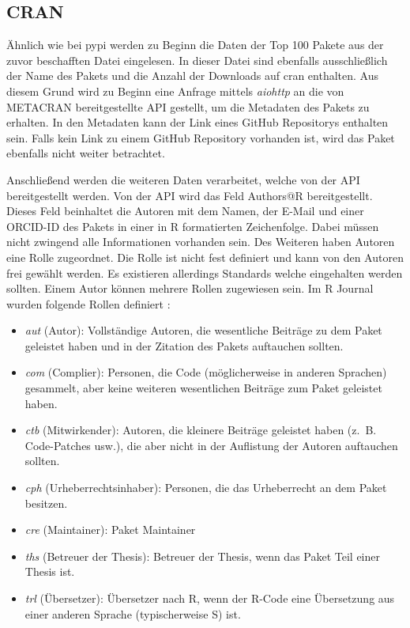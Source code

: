 \subsection{CRAN}
\label{subsec:datenbeschaffung_cran}
Ähnlich wie bei \gls{pypi} werden zu Beginn die Daten der Top 100 Pakete aus der zuvor beschafften Datei eingelesen.
In dieser Datei sind ebenfalls ausschließlich der Name des Pakets und die Anzahl der Downloads auf \gls{cran} enthalten.
Aus diesem Grund wird zu Beginn eine Anfrage mittels \emph{aiohttp} an die von METACRAN bereitgestellte API gestellt, um die Metadaten des Pakets zu erhalten.
In den Metadaten kann der Link eines GitHub Repositorys enthalten sein.
Falls kein Link zu einem GitHub Repository vorhanden ist, wird das Paket ebenfalls nicht weiter betrachtet.

Anschließend werden die weiteren Daten verarbeitet, welche von der API bereitgestellt werden.
Von der API wird das Feld \glqq Authors@R\grqq{} bereitgestellt.
Dieses Feld beinhaltet die Autoren mit dem Namen, der E-Mail und einer ORCID-ID des Pakets in einer in R formatierten Zeichenfolge.
Dabei müssen nicht zwingend alle Informationen vorhanden sein.
Des Weiteren haben Autoren eine Rolle zugeordnet.
Die Rolle ist nicht fest definiert und kann von den Autoren frei gewählt werden.
Es existieren allerdings Standards welche eingehalten werden sollten.
Einem Autor können mehrere Rollen zugewiesen sein.
Im R Journal wurden folgende Rollen definiert \autocite{hornik_who_2011}:

\begin{itemize}
    \item \glqq \emph{aut}\grqq{} (Autor): Vollständige Autoren, die wesentliche Beiträge zu dem Paket geleistet haben und in der Zitation des Pakets auftauchen sollten.
    \item \glqq \emph{com}\grqq{} (Complier): Personen, die Code (möglicherweise in anderen Sprachen) gesammelt, aber keine weiteren wesentlichen Beiträge zum Paket geleistet haben.
    \item \glqq \emph{ctb}\grqq{} (Mitwirkender): Autoren, die kleinere Beiträge geleistet haben (z. B. Code-Patches usw.), die aber nicht in der Auflistung der Autoren auftauchen sollten.
    \item \glqq \emph{cph}\grqq{} (Urheberrechtsinhaber): Personen, die das Urheberrecht an dem Paket besitzen.
    \item \glqq \emph{cre}\grqq{} (Maintainer): Paket Maintainer
    \item \glqq \emph{ths}\grqq{} (Betreuer der Thesis): Betreuer der Thesis, wenn das Paket Teil einer Thesis ist.
    \item \glqq \emph{trl}\grqq{} (Übersetzer): Übersetzer nach R, wenn der R-Code eine Übersetzung aus einer anderen Sprache (typischerweise S) ist.
\end{itemize}

